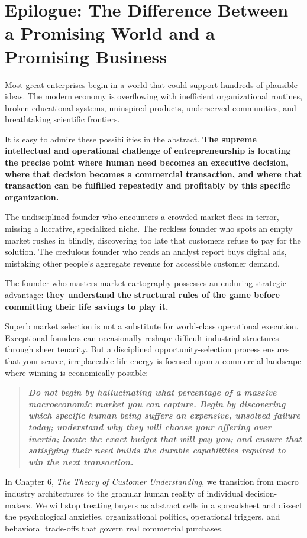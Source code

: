 \section*{Epilogue: The Difference Between a Promising World and a Promising Business}

Most great enterprises begin in a world that could support hundreds of plausible ideas. The modern economy is overflowing with inefficient organizational routines, broken educational systems, uninspired products, underserved communities, and breathtaking scientific frontiers.

It is easy to admire these possibilities in the abstract. \textbf{The supreme intellectual and operational challenge of entrepreneurship is locating the precise point where human need becomes an executive decision, where that decision becomes a commercial transaction, and where that transaction can be fulfilled repeatedly and profitably by this specific organization.}

The undisciplined founder who encounters a crowded market flees in terror, missing a lucrative, specialized niche. The reckless founder who spots an empty market rushes in blindly, discovering too late that customers refuse to pay for the solution. The credulous founder who reads an analyst report buys digital ads, mistaking other people's aggregate revenue for accessible customer demand.

The founder who masters market cartography possesses an enduring strategic advantage: \textbf{they understand the structural rules of the game before committing their life savings to play it.}

Superb market selection is not a substitute for world-class operational execution. Exceptional founders can occasionally reshape difficult industrial structures through sheer tenacity. But a disciplined opportunity-selection process ensures that your scarce, irreplaceable life energy is focused upon a commercial landscape where winning is economically possible:

\begin{quote}
\bfseries\itshape
Do not begin by hallucinating what percentage of a massive macroeconomic market you can capture. Begin by discovering which specific human being suffers an expensive, unsolved failure today; understand why they will choose your offering over inertia; locate the exact budget that will pay you; and ensure that satisfying their need builds the durable capabilities required to win the next transaction.
\end{quote}

In Chapter 6, \textit{The Theory of Customer Understanding}, we transition from macro industry architectures to the granular human reality of individual decision-makers. We will stop treating buyers as abstract cells in a spreadsheet and dissect the psychological anxieties, organizational politics, operational triggers, and behavioral trade-offs that govern real commercial purchases.
